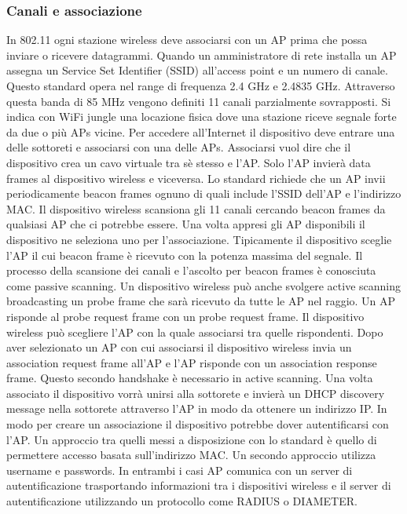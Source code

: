 \subsubsection{Canali e associazione}
In 802.11 ogni stazione wireless deve associarsi con un AP prima che possa inviare o ricevere datagrammi. Quando un amministratore di rete installa un AP assegna un Service Set Identifier (SSID) all'access 
point e un numero di canale. Questo standard opera nel range di frequenza 2.4 GHz e 2.4835 GHz. Attraverso questa banda di 85 MHz vengono definiti 11 canali parzialmente sovrapposti. Si indica con
WiFi jungle una locazione fisica dove una stazione riceve segnale forte da due o pi\`u APs vicine. Per accedere all'Internet il dispositivo deve entrare una delle sottoreti e associarsi con una delle APs. Associarsi
vuol dire che il dispositivo crea un cavo virtuale tra s\`e stesso e l'AP. Solo l'AP invier\`a data frames al dispositivo wireless e viceversa. Lo standard richiede che un AP invii periodicamente beacon frames ognuno 
di quali include l'SSID dell'AP e l'indirizzo MAC. Il dispositivo wireless scansiona gli 11 canali cercando beacon frames da qualsiasi AP che ci potrebbe essere. Una volta appresi gli AP disponibili il dispositivo ne
seleziona uno per l'associazione. Tipicamente il dispositivo sceglie l'AP il cui beacon frame \`e ricevuto con la potenza massima del segnale. Il processo della scansione dei canali e l'ascolto per beacon frames \`e
conosciuta come passive scanning. Un dispositivo wireless pu\`o anche svolgere active scanning broadcasting un probe frame che sar\`a ricevuto da tutte le AP nel raggio. Un AP risponde al probe request frame
con un probe request frame. Il dispositivo wireless pu\`o scegliere l'AP con la quale associarsi tra quelle rispondenti. Dopo aver selezionato un AP con cui associarsi il dispositivo wireless invia un association 
request frame all'AP e l'AP risponde con un association response frame. Questo secondo handshake \`e necessario in active scanning. Una volta associato il dispositivo vorr\`a unirsi alla sottorete e invier\`a
un DHCP discovery message nella sottorete attraverso l'AP in modo da ottenere un indirizzo IP. In modo per creare un associazione il dispositivo potrebbe dover autentificarsi con l'AP. Un approccio tra quelli
messi a disposizione con lo standard \`e quello di permettere accesso basata sull'indirizzo MAC. Un secondo approccio utilizza username e passwords. In entrambi i casi AP comunica con un server di 
autentificazione trasportando informazioni tra i dispositivi wireless e il server di autentificazione utilizzando un protocollo come RADIUS o DIAMETER.
